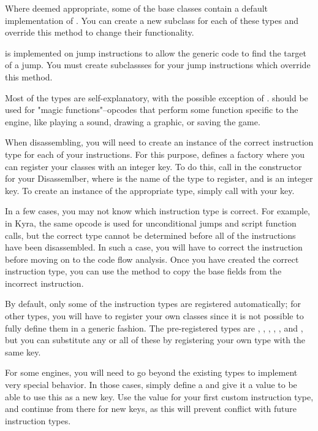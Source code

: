Where deemed appropriate, some of the base classes contain a default implementation of . You can create a new subclass for each of these types and override this method to change their functionality.

 is implemented on jump instructions to allow the generic code to find the target of a jump. You must create subclassses for your jump instructions which override this method.

Most of the types are self-explanatory, with the possible exception of .  should be used for "magic functions"--opcodes that perform some function specific to the engine, like playing a sound, drawing a graphic, or saving the game.

When disassembling, you will need to create an instance of the correct instruction type for each of your instructions. For this purpose,  defines a factory  where you can register your classes with an integer key. To do this, call  in the constructor for your Disassemlber, where  is the name of the type to register, and  is an integer key. To create an instance of the appropriate type, simply call  with your key.

In a few cases, you may not know which instruction type is correct. For example, in Kyra, the same opcode is used for unconditional jumps and script function calls, but the correct type cannot be determined before all of the instructions have been disassembled. In such a case, you will have to correct the instruction before moving on to the code flow analysis. Once you have created the correct instruction type, you can use the  method to copy the base fields from the incorrect instruction.

By default, only some of the instruction types are registered automatically; for other types, you will have to register your own classes since it is not possible to fully define them in a generic fashion. The pre-registered types are , , , , ,  and , but you can substitute any or all of these by registering your own type with the same key.

For some engines, you will need to go beyond the existing types to implement very special behavior. In those cases, simply define a  and give it a value to be able to use this as a new key. Use the value  for your first custom instruction type, and continue from there for new keys, as this will prevent conflict with future instruction types.

